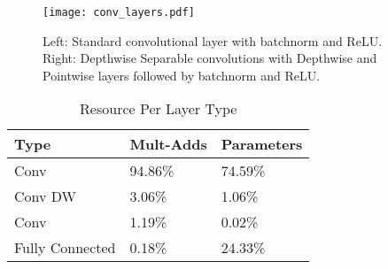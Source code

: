 \documentclass[10pt,twocolumn,letterpaper]{article}
\begin{document}
\begin{table}[t]
  \caption{MobileNet Body Architecture} \centering {}
\end{table}

\begin{figure}
  \centering
  \texttt{[image: conv\_layers.pdf]}
  \caption{Left: Standard convolutional layer with batchnorm and ReLU. Right: Depthwise Separable convolutions with Depthwise and Pointwise layers followed by batchnorm and ReLU.}
  \label{fig:conv_layers}
\end{figure}

\begin{table}[t]
  \caption{Resource Per Layer Type} \centering \begin{tabular}{l | l | l} \hline\hline Type & Mult-Adds  & Parameters \\ [0.5ex] \hline Conv  & 94.86\% & 74.59\%   \\ \hline
Conv DW  & 3.06\% & 1.06\% \\
\hline
Conv  & 1.19\% & 0.02\% \\
\hline
Fully Connected & 0.18\% & 24.33\% \\
[1ex] \hline \end{tabular}
\label{table:percent} \end{table}
\end{document}
